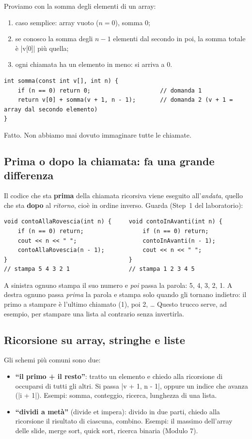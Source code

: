 Proviamo con la somma degli elementi di un array:
\begin{enumerate}
  \item caso semplice: array vuoto ($n = 0$), somma 0;
  \item se conosco la somma degli $n-1$ elementi dal secondo in poi, la somma totale
        è \cc|v[0]| più quella;
  \item ogni chiamata ha un elemento in meno: si arriva a 0.
\end{enumerate}
\begin{lstlisting}
int somma(const int v[], int n) {
    if (n == 0) return 0;                    // domanda 1
    return v[0] + somma(v + 1, n - 1);       // domanda 2 (v + 1 = array dal secondo elemento)
}
\end{lstlisting}
Fatto. Non abbiamo mai dovuto immaginare tutte le chiamate.

\subsection*{Prima o dopo la chiamata: fa una grande differenza}

Il codice che sta \textbf{prima} della chiamata ricorsiva viene eseguito
all'\emph{andata}, quello che sta \textbf{dopo} al \emph{ritorno}, cioè in ordine
inverso. Guarda (Step~1 del laboratorio):
\begin{lstlisting}
void contoAllaRovescia(int n) {     void contoInAvanti(int n) {
    if (n == 0) return;                 if (n == 0) return;
    cout << n << " ";                   contoInAvanti(n - 1);
    contoAllaRovescia(n - 1);           cout << n << " ";
}                                   }
// stampa 5 4 3 2 1                 // stampa 1 2 3 4 5
\end{lstlisting}
A sinistra ognuno stampa il suo numero e \emph{poi} passa la parola: 5, 4, 3, 2, 1.
A destra ognuno passa \emph{prima} la parola e stampa solo quando gli tornano
indietro: il primo a stampare è l'ultimo chiamato (1), poi 2, \ldots{} Questo
trucco serve, ad esempio, per stampare una lista al contrario senza invertirla.

\subsection*{Ricorsione su array, stringhe e liste}

Gli schemi più comuni sono due:
\begin{itemize}
  \item \textbf{``il primo + il resto''}: tratto un elemento e chiedo alla ricorsione
        di occuparsi di tutti gli altri. Si passa \cc|v + 1, n - 1|, oppure un indice
        che avanza (\cc|i + 1|). Esempi: somma, conteggio, ricerca, lunghezza di una lista.
  \item \textbf{``dividi a metà''} (divide et impera): divido in due parti, chiedo
        alla ricorsione il risultato di ciascuna, combino. Esempi: il massimo
        dell'array delle slide, merge sort, quick sort, ricerca binaria (Modulo 7).
\end{itemize}

